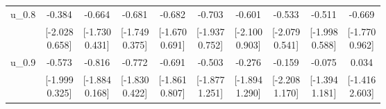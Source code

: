 {\begin{tabular}{lccccccccc}
u\_0.8 & -0.384 & -0.664 & -0.681 & -0.682 & -0.703 & -0.601 & -0.533 & -0.511 & -0.669 \\
 & \shortstack{[-2.028\\0.658]} & \shortstack{[-1.730\\0.431]} & \shortstack{[-1.749\\0.375]} & \shortstack{[-1.670\\0.691]} & \shortstack{[-1.937\\0.752]} & \shortstack{[-2.100\\0.903]} & \shortstack{[-2.079\\0.541]} & \shortstack{[-1.998\\0.588]} & \shortstack{[-1.770\\0.962]} \\[0.25em]
u\_0.9 & -0.573 & -0.816 & -0.772 & -0.691 & -0.503 & -0.276 & -0.159 & -0.075 & 0.034 \\
 & \shortstack{[-1.999\\0.325]} & \shortstack{[-1.884\\0.168]} & \shortstack{[-1.830\\0.422]} & \shortstack{[-1.861\\0.807]} & \shortstack{[-1.877\\1.251]} & \shortstack{[-1.894\\1.290]} & \shortstack{[-2.208\\1.170]} & \shortstack{[-1.394\\1.181]} & \shortstack{[-1.416\\2.603]} \\[0.25em]
\bottomrule
\end{tabular}
}
